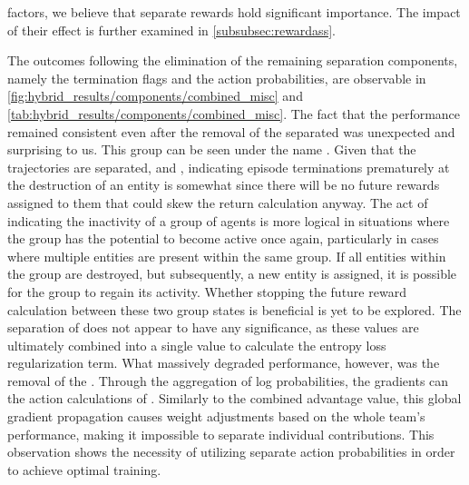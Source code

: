 factors, we believe that separate rewards hold significant importance. The impact of their effect is further examined in \autoref{subsubsec:rewardass}.

\bigskip

\noindent The outcomes following the elimination of the remaining separation components, namely the termination flags and the action probabilities, are observable in \autoref{fig:hybrid_results/components/combined_misc} and \autoref{tab:hybrid_results/components/combined_misc}. The fact that the performance remained consistent even after the removal of the separated  was unexpected and surprising to us. This group can be seen under the name . Given that the trajectories are separated, and , indicating episode terminations prematurely at the destruction of an entity is somewhat  since there will be no future rewards assigned to them that could skew the return calculation anyway. The act of indicating the inactivity of a group of agents is more logical in situations where the group has the potential to become active once again, particularly in cases where multiple entities are present within the same group. If all entities within the group are destroyed, but subsequently, a new entity is assigned, it is possible for the group to regain its activity. Whether stopping the future reward calculation between these two group states is beneficial is yet to be explored. The separation of  does not appear to have any significance, as these values are ultimately combined into a single value to calculate the entropy loss regularization term. What massively degraded performance, however, was the removal of the . Through the aggregation of log probabilities, the gradients can  the action calculations of . Similarly to the combined advantage value, this global gradient propagation causes weight adjustments based on the whole team's performance, making it impossible to separate individual contributions. This observation shows the necessity of utilizing separate action probabilities in order to achieve optimal training.

